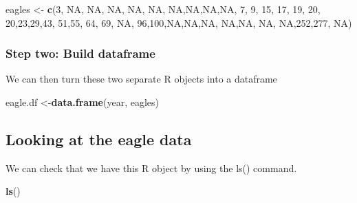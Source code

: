 \documentclass[]{book}
\newenvironment{Shaded}{\begin{snugshade}}{\end{snugshade}}
\newcommand{\KeywordTok}[1]{\textcolor[rgb]{0.13,0.29,0.53}{\textbf{#1}}}
\newcommand{\DecValTok}[1]{\textcolor[rgb]{0.00,0.00,0.81}{#1}}
\newcommand{\StringTok}[1]{\textcolor[rgb]{0.31,0.60,0.02}{#1}}
\newcommand{\OtherTok}[1]{\textcolor[rgb]{0.56,0.35,0.01}{#1}}
\newcommand{\NormalTok}[1]{#1}
\theoremstyle{definition}
\theoremstyle{definition}
\theoremstyle{definition}
\theoremstyle{remark}
\begin{document}
\begin{Shaded}
\begin{Highlighting}[]
\NormalTok{eagles <-}\StringTok{  }\KeywordTok{c}\NormalTok{(}\DecValTok{3}\NormalTok{, }\OtherTok{NA}\NormalTok{, }\OtherTok{NA}\NormalTok{, }\OtherTok{NA}\NormalTok{, }\OtherTok{NA}\NormalTok{, }\OtherTok{NA}\NormalTok{, }\OtherTok{NA}\NormalTok{,}\OtherTok{NA}\NormalTok{,}\OtherTok{NA}\NormalTok{,}\OtherTok{NA}\NormalTok{,}
             \DecValTok{7}\NormalTok{,  }\DecValTok{9}\NormalTok{, }\DecValTok{15}\NormalTok{, }\DecValTok{17}\NormalTok{, }\DecValTok{19}\NormalTok{, }\DecValTok{20}\NormalTok{, }\DecValTok{20}\NormalTok{,}\DecValTok{23}\NormalTok{,}\DecValTok{29}\NormalTok{,}\DecValTok{43}\NormalTok{,}
             \DecValTok{51}\NormalTok{,}\DecValTok{55}\NormalTok{, }\DecValTok{64}\NormalTok{, }\DecValTok{69}\NormalTok{, }\OtherTok{NA}\NormalTok{, }\DecValTok{96}\NormalTok{,}\DecValTok{100}\NormalTok{,}\OtherTok{NA}\NormalTok{,}\OtherTok{NA}\NormalTok{,}\OtherTok{NA}\NormalTok{,}
             \OtherTok{NA}\NormalTok{,}\OtherTok{NA}\NormalTok{, }\OtherTok{NA}\NormalTok{, }\OtherTok{NA}\NormalTok{,}\DecValTok{252}\NormalTok{,}\DecValTok{277}\NormalTok{, }\OtherTok{NA}\NormalTok{)}
\end{Highlighting}
\end{Shaded}

\subsubsection{Step two: Build
dataframe}\label{step-two-build-dataframe}

We can then turn these two separate R objects into a dataframe

\begin{Shaded}
\begin{Highlighting}[]
\NormalTok{eagle.df <-}\KeywordTok{data.frame}\NormalTok{(year, eagles)}
\end{Highlighting}
\end{Shaded}

\subsection{Looking at the eagle data}\label{looking-at-the-eagle-data}

We can check that we have this R object by using the ls() command.

\begin{Shaded}
\begin{Highlighting}[]
\KeywordTok{ls}\NormalTok{()}
\end{Highlighting}
\end{Shaded}
\end{document}
